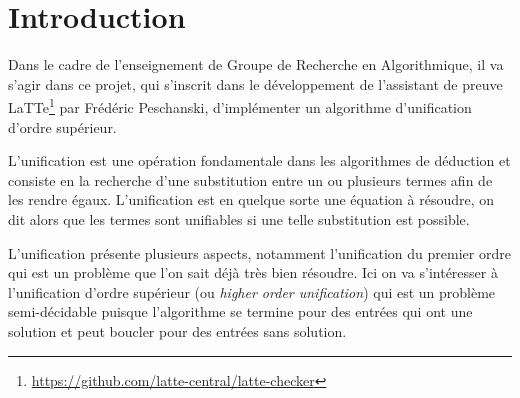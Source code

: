 \section{Introduction}

Dans le cadre de l'enseignement de Groupe de Recherche en Algorithmique, il va s'agir dans ce projet, qui s'inscrit dans le développement de l'assistant de preuve LaTTe\footnote{\url{https://github.com/latte-central/latte-checker}} par Frédéric Peschanski, d'implémenter un algorithme d'unification d'ordre supérieur.

L'unification est une opération fondamentale dans les algorithmes de déduction et consiste en la recherche d'une substitution entre un ou plusieurs termes afin de les rendre égaux. L'unification est en quelque sorte une équation à résoudre, on dit alors que les termes sont unifiables si une telle substitution est possible.

L'unification présente plusieurs aspects, notamment l'unification du premier ordre qui est un problème que l'on sait déjà très bien résoudre. Ici on va s'intéresser à l'unification d'ordre supérieur (ou \textit{higher order unification}) qui est un problème semi-décidable puisque l'algorithme se termine pour des entrées qui ont une solution et peut boucler pour des entrées sans solution.